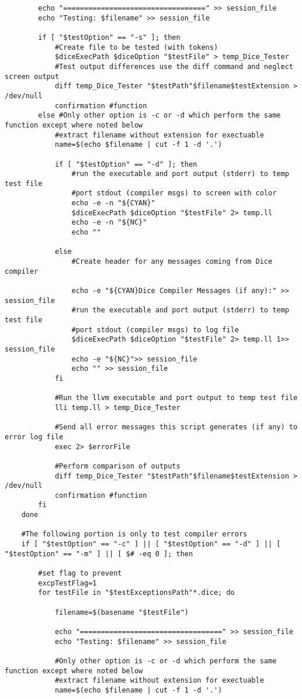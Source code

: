 \begin{verbatim}
		echo "==================================" >> session_file
		echo "Testing: $filename" >> session_file

		if [ "$testOption" == "-s" ]; then
			#Create file to be tested (with tokens)
			$diceExecPath $diceOption "$testFile" > temp_Dice_Tester
			#Test output differences use the diff command and neglect screen output
			diff temp_Dice_Tester "$testPath"$filename$testExtension > /dev/null
			confirmation #function
		else #Only other option is -c or -d which perform the same function except where noted below
			#extract filename without extension for exectuable
			name=$(echo $filename | cut -f 1 -d '.')
			
			if [ "$testOption" == "-d" ]; then
				#run the executable and port output (stderr) to temp test file
				#port stdout (compiler msgs) to screen with color
				echo -e -n "${CYAN}"
				$diceExecPath $diceOption "$testFile" 2> temp.ll 
				echo -e -n "${NC}"
				echo ""

			else
				#Create header for any messages coming from Dice compiler
				
				echo -e "${CYAN}Dice Compiler Messages (if any):" >> session_file
				#run the executable and port output (stderr) to temp test file
				#port stdout (compiler msgs) to log file
				$diceExecPath $diceOption "$testFile" 2> temp.ll 1>> session_file
				echo -e "${NC}">> session_file
				echo "" >> session_file
			fi

			#Run the llvm executable and port output to temp test file
			lli temp.ll > temp_Dice_Tester

			#Send all error messages this script generates (if any) to error log file
			exec 2> $errorFile
			
			#Perform comparison of outputs
			diff temp_Dice_Tester "$testPath"$filename$testExtension > /dev/null
			confirmation #function
		fi
	done

	#The following portion is only to test compiler errors
	if [ "$testOption" == "-c" ] || [ "$testOption" == "-d" ] || [ "$testOption" == "-m" ] || [ $# -eq 0 ]; then

		#set flag to prevent 
		excpTestFlag=1
		for testFile in "$testExceptionsPath"*.dice; do

			filename=$(basename "$testFile")

			echo "==================================" >> session_file
			echo "Testing: $filename" >> session_file
		
			#Only other option is -c or -d which perform the same function except where noted below
			#extract filename without extension for exectuable
			name=$(echo $filename | cut -f 1 -d '.')
				

\end{verbatim}
